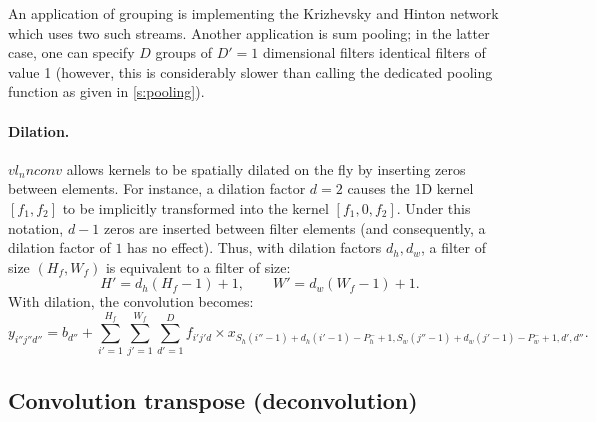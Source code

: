 An application of grouping is implementing the Krizhevsky and Hinton network~\cite{krizhevsky12imagenet} which uses two such streams. Another application is sum pooling; in the latter case, one can specify $D$ groups of $D'=1$ dimensional filters identical filters of value 1 (however, this is considerably slower than calling the dedicated pooling function as given in \cref{s:pooling}).

\paragraph{Dilation.} $vl_nnconv$ allows kernels to be spatially dilated on the fly by inserting zeros between elements. For instance, a dilation factor $d=2$ causes the 1D kernel $[f_1,f_2]$ to be implicitly transformed into the kernel $[f_1,0,f_2]$. Under this notation, $d-1$ zeros are inserted between filter elements (and consequently, a dilation factor of $1$ has no effect). Thus, with dilation factors $d_h,d_w$, a filter of size $(H_f,W_f)$ is equivalent to a filter of size:
\[
H' = d_h(H_f - 1) + 1,
\qquad
W' = d_w(W_f - 1) + 1.
\]
With dilation, the convolution becomes:
\[
y_{i''j''d''}
=
b_{d''}
+
\sum_{i'=1}^{H_f}
\sum_{j'=1}^{W_f}
\sum_{d'=1}^D
f_{i'j'd} \times x_{
	S_h (i''-1)+d_h(i'-1)-P_h^-+1,
	S_w (j''-1)+d_w(j'-1)-P_w^-+1,
	d',d''}.
\]


\subsection{Convolution transpose (deconvolution)}\label{s:convt}

